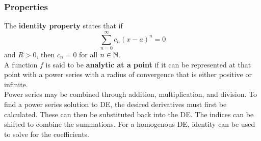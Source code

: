 \documentclass[./Differential Equations.tex]{subfiles}
\begin{document}
			\subsubsection*{Properties}
				The \textbf{identity property} states that if
					\[\sum_{n = 0}^\infty c_n(x - a)^n = 0\]
					and \(R > 0\), then \(c_n = 0\) for all \(n \in \mathbb{N}\). \\
				A function \(f\) is said to be \textbf{analytic at a point} if it can be represented at that point with a power series with a radius of convergence that is either positive or infinite. \\
				Power series may be combined through addition, multiplication, and division.
				\callout{17}{\paragraph{Common Maclaurin Series}
					\[\def\arraystretch{2}\begin{array}{|c|c|c|}\hline
						f(x) & \text{Maclaurin Series} & \text{Interval of Convergence} \\\hline
						e^x & \displaystyle\sum_{n = 0}^\infty \frac{1}{n!}x^n & \R \\
						\cos x & \displaystyle\sum_{n = 0}^\infty \frac{(-1)^n}{(2n)!}x^{2n} & \R \\
						\sin x & \displaystyle\sum_{n = 0}^\infty \frac{(-1)^n}{(2n + 1)!}x^{2n + 1} & \R \\
						\arctan x & \displaystyle\sum_{n = 0}^\infty \frac{(-1)^n}{2n + 1}x^{2n + 1} & [-1, 1] \\
						\cosh x & \displaystyle\sum_{n = 0}^\infty \frac{1}{(2n)!}x^{2n} & \R \\
						\sinh x & \displaystyle\sum_{n = 0}^\infty \frac{1}{(2n + 1)!}x^{2n + 1} & \R \\
						\ln(1 + x) & \displaystyle\sum_{n = 1}^\infty \frac{(-1)^{n + 1}}{n}x^n & (-1, 1] \\
						\displaystyle\frac{1}{1 - x} & \displaystyle\sum_{n = 0}^\infty x^n & (-1, 1) \\\hline
					\end{array}\]
				}
			To find a power series solution to DE, the desired derivatives must first be calculated. These can then be substituted back into the DE. The indices can be shifted to combine the summations. For a homogenous DE, identity can be used to solve for the coefficients.
\end{document}

